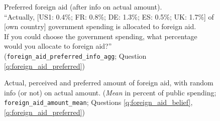 \begin{figure}[h!]
    \cprotect\caption[Preferred foreign aid (after info on actual amount)]{Preferred foreign aid (after info on actual amount). \\ ``Actually,
    [US1: 0.4\%; FR: 0.8\%; DE: 1.3\%; ES: 0.5\%; UK: 1.7\%] of [own country] government spending is allocated to foreign aid. \\
    If you could choose the government spending, what percentage would you allocate
    to foreign aid?'' (\verb|foreign_aid_preferred_info_agg|; Question \ref{q:foreign_aid_preferred})  %
    }\label{fig:foreign_aid_preferred_info}
\end{figure}

\begin{figure} 
    \cprotect\caption[Actual, perceived and preferred amount of foreign aid (mean)]{Actual, perceived and preferred amount of foreign aid, with random info (or not) on actual amount. (\textit{Mean} in percent of public spending; \verb|foreign_aid_amount_mean|; Questions \ref{q:foreign_aid_belief}, \ref{q:foreign_aid_preferred})  %
    }\label{fig:foreign_aid_amount}
\end{figure}

